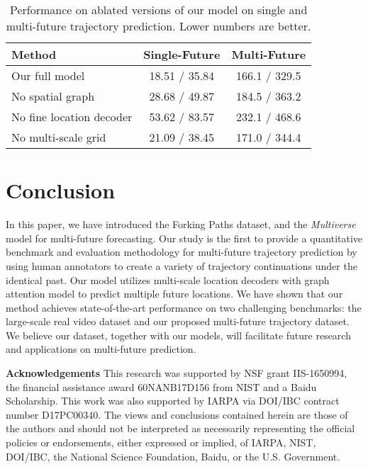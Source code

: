 \documentclass[10pt,twocolumn,letterpaper]{article}
\newcommand{\fancyname}{Multiverse}\newcommand{\Tpred}{T_{\text{pred}}}
\begin{document}
\begin{table}
\centering
\small
\begin{tabular}{l||c|c}
\hline
Method                             & Single-Future & Multi-Future \\ \hline
Our full model      &   18.51 / 35.84  &    166.1 / 329.5    \\ \hline
No spatial graph         &   28.68 / 49.87  & 184.5 / 363.2     \\ 
No fine location decoder                 &   53.62 / 83.57   &  232.1 / 468.6 \\ 
No multi-scale grid                       &  21.09 / 38.45     &    171.0 / 344.4     \\ \hline
\end{tabular}
\vspace{-3mm}
\caption{Performance on ablated versions of our model on single and multi-future trajectory prediction. 
Lower numbers are better.}
\label{tab:exp-ablation}
\vspace{-6mm}
\end{table}
  \vspace{-2mm}
\section{Conclusion}
\label{sec:concl}
\vspace{-2mm}
In this paper,
we have introduced the Forking Paths dataset, 
and the \textit{\fancyname} model for multi-future forecasting.
Our study is the first to provide a quantitative benchmark and evaluation methodology for 
multi-future trajectory prediction by using human annotators to create a variety
of trajectory continuations under the identical past.
Our model utilizes multi-scale location decoders with 
graph attention model to predict multiple future locations.
We have shown that our method achieves state-of-the-art performance on two
challenging benchmarks: the large-scale real video dataset and our proposed multi-future trajectory dataset.
We believe our dataset, together with our models, will facilitate future research and applications on multi-future prediction.
 
\noindent\textbf{Acknowledgements} 
This research was supported by NSF grant IIS-1650994, the financial assistance award 60NANB17D156 from NIST and a Baidu Scholarship.
This work was also supported by IARPA
via DOI/IBC contract number D17PC00340.
The views and
conclusions contained herein are those of the authors and
should not be interpreted as necessarily representing the official policies or endorsements, either expressed or implied,
of IARPA, NIST, DOI/IBC, the National Science Foundation, Baidu, or the U.S. Government.

{


}
\end{document}
